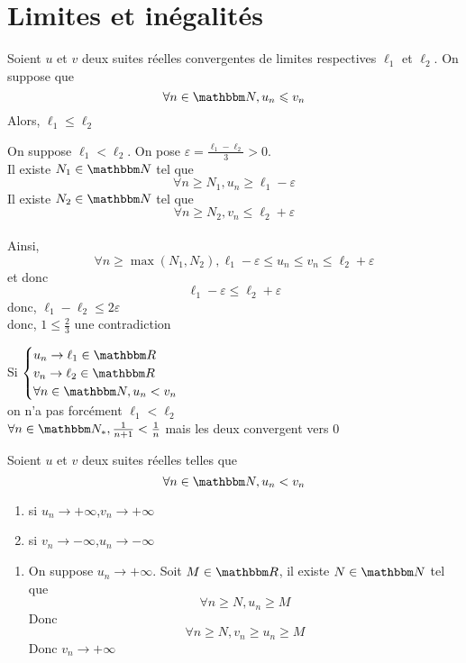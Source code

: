 \part{Limites et inégalités}

\begin{prop}
	Soient $u$ et $v$ deux suites réelles convergentes de limites respectives $\ell_1$ et $\ell_2$. On suppose que \[
	\forall n \in \N, u_n \le  v_n
	\]
	Alors, $\ell_1\le\ell_2$
\end{prop}

\begin{prv}
	On suppose $\ell_1<\ell_2$. On pose $\varepsilon = \frac{\ell_1 -\ell_2}{3} > 0$.\\
	Il existe $N_1 \in \N$ tel que \[
	\forall n \ge  N_1, u_n \ge  \ell_1-\varepsilon
	\] Il existe $N_2\in \N$ tel que \[
	\forall n \ge  N_2, v_n \le  \ell_2 + \varepsilon
	\]\\
	Ainsi, \[
	\forall n \ge  \max(N_1,N_2), \ell_1 - \varepsilon \le  u_n \le  v_n\le  \ell_2 + \varepsilon
	\] et donc \[
	\ell_1-\varepsilon\le \ell_2+\varepsilon
	\] donc, $\ell_1 - \ell_2 \le 2 \varepsilon$\\
	donc, $1 \le \frac{2}{3}$ une contradiction
\end{prv}

\begin{rmk}
	Si $\begin{cases}
		u_n \to  \ell_1 \in \R\\
		v_n \to  \ell_2 \in \R\\
		\forall n \in \N, u_n < v_n
	\end{cases}$\\ on n'a pas forcément $\ell_1 < \ell_2$\\
	\ex $\forall n \in \N_*, \frac{1}{n+1}< \frac{1}{n}$ mais les deux convergent vers $0$
\end{rmk}

\begin{prop}
	Soient $u$ et $v$ deux suites réelles telles que \[
	\forall n\in \N, u_n < v_n
	\]
	\begin{enumerate}
		\item si $u_n\to  +\infty$,$v_n \to +\infty$
		\item si $v_n\to  -\infty$,$u_n \to -\infty$
	\end{enumerate}
\end{prop}

\begin{prv}
	\begin{enumerate}
		\item On suppose $u_n \to +\infty$. Soit $M \in \R$, il existe $N \in \N$ tel que \[
		\forall n \ge  N, u_n \ge M
		\] Donc \[
		\forall n \ge N, v_n \ge u_n \ge  M
		\] Donc $v_n \to  +\infty$
	\end{enumerate}
\end{prv}

